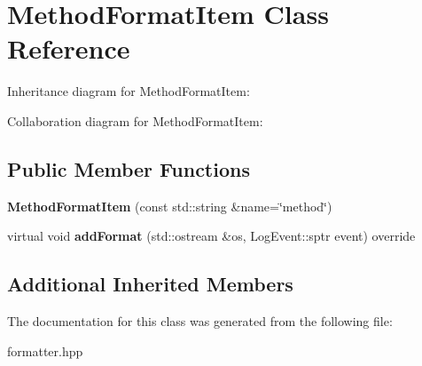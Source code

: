 \hypertarget{classMethodFormatItem}{}\section{Method\+Format\+Item Class Reference}
\label{classMethodFormatItem}


Inheritance diagram for Method\+Format\+Item\+:


Collaboration diagram for Method\+Format\+Item\+:
\subsection*{Public Member Functions}
\begin{DoxyCompactItemize}
\item 
\mbox{\label{classMethodFormatItem_af9c902c0fdbedf65c23c6eceb0f919ac}} 
{\bfseries Method\+Format\+Item} (const std\+::string \&name=\char`\"{}method\char`\"{})
\item 
\mbox{\label{classMethodFormatItem_a3418536386d0cb58e3ca150b6fbc3b55}} 
virtual void {\bfseries add\+Format} (std\+::ostream \&os, Log\+Event\+::sptr event) override
\end{DoxyCompactItemize}
\subsection*{Additional Inherited Members}


The documentation for this class was generated from the following file\+:\begin{DoxyCompactItemize}
\item 
formatter.\+hpp\end{DoxyCompactItemize}
